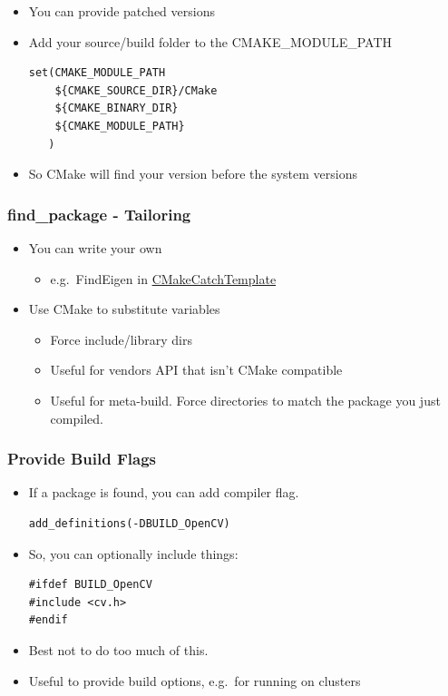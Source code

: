 \begin{itemize}
\item
  You can provide patched versions
\item
  Add your source/build folder to the CMAKE\_MODULE\_PATH

\begin{verbatim}
set(CMAKE_MODULE_PATH
    ${CMAKE_SOURCE_DIR}/CMake
    ${CMAKE_BINARY_DIR}
    ${CMAKE_MODULE_PATH}
   )
\end{verbatim}
\item
  So CMake will find your version before the system versions
\end{itemize}

\subsubsection{find\_package -
Tailoring}\label{findux5fpackage---tailoring}

\begin{itemize}
\itemsep1pt\parskip0pt
\item
  You can write your own

  \begin{itemize}
  \itemsep1pt\parskip0pt
  \item
    e.g.~FindEigen in
    \href{https://github.com/MattClarkson/CMakeCatchTemplate/blob/master/CMake/FindEigen.cmake}{CMakeCatchTemplate}
  \end{itemize}
\item
  Use CMake to substitute variables

  \begin{itemize}
  \itemsep1pt\parskip0pt
  \item
    Force include/library dirs
  \item
    Useful for vendors API that isn't CMake compatible
  \item
    Useful for meta-build. Force directories to match the package you
    just compiled.
  \end{itemize}
\end{itemize}

\subsubsection{Provide Build Flags}\label{provide-build-flags}

\begin{itemize}
\item
  If a package is found, you can add compiler flag.

\begin{verbatim}
add_definitions(-DBUILD_OpenCV)
\end{verbatim}
\item
  So, you can optionally include things:

\begin{verbatim}
#ifdef BUILD_OpenCV
#include <cv.h>
#endif
\end{verbatim}
\item
  Best not to do too much of this.
\item
  Useful to provide build options, e.g.~for running on clusters
\end{itemize}

